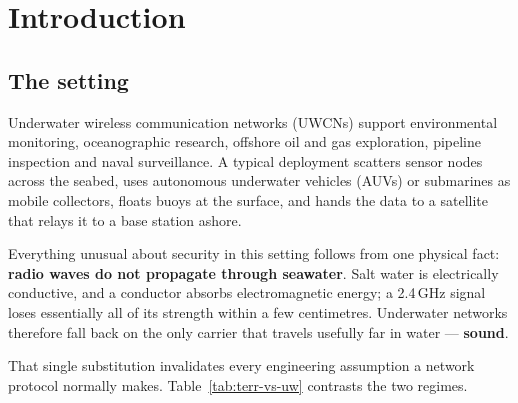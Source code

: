 \chapter{Introduction}
\label{ch:intro}

\section{The setting}

Underwater wireless communication networks (UWCNs) support environmental monitoring,
oceanographic research, offshore oil and gas exploration, pipeline inspection and naval
surveillance. A typical deployment scatters sensor nodes across the seabed, uses autonomous
underwater vehicles (AUVs) or submarines as mobile collectors, floats buoys at the surface,
and hands the data to a satellite that relays it to a base station ashore.

Everything unusual about security in this setting follows from one physical fact:
\textbf{radio waves do not propagate through seawater}. Salt water is electrically
conductive, and a conductor absorbs electromagnetic energy; a 2.4\,GHz signal loses
essentially all of its strength within a few centimetres. Underwater networks therefore fall
back on the only carrier that travels usefully far in water --- \textbf{sound}.

That single substitution invalidates every engineering assumption a network protocol
normally makes. Table~\ref{tab:terr-vs-uw} contrasts the two regimes.

